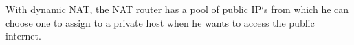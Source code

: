 With dynamic NAT, the NAT router has a pool of public IP`s from which he can choose one to assign to a private host when he wants to access the public internet.
